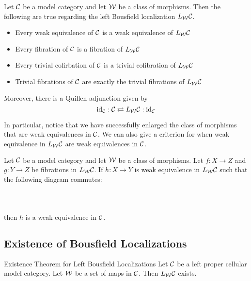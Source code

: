 \documentclass[a4paper]{article}
\begin{document}
\begin{thm}{}{} Let $\mathcal{C}$ be a model category and let $\mathcal{W}$ be a class of morphisms. Then the following are true regarding the left Bousfield localization $L_{\mathcal{W}}\mathcal{C}$. 
\begin{itemize}
\item Every weak equivalence of $\mathcal{C}$ is a weak equivalence of $L_{\mathcal{W}}\mathcal{C}$
\item Every fibration of $\mathcal{C}$ is a fibration of $L_{\mathcal{W}}\mathcal{C}$
\item Every trivial cofirbation of $\mathcal{C}$ is a trivial cofibration of $L_{\mathcal{W}}\mathcal{C}$
\item Trivial fibrations of $\mathcal{C}$ are exactly the trivial fibrations of $L_{\mathcal{W}}\mathcal{C}$
\end{itemize}
Moreover, there is a Quillen adjunction given by $$\text{id}_{\mathcal{C}}:\mathcal{C}\rightleftarrows L_{\mathcal{W}}\mathcal{C}:\text{id}_{\mathcal{C}}$$
\end{thm}

In particular, notice that we have successfully enlarged the class of morphisms that are weak equivalences in $\mathcal{C}$. We can also give a criterion for when weak equivalence in $L_{\mathcal{W}}\mathcal{C}$ are weak equivalences in $\mathcal{C}$. 

\begin{prp}{}{} Let $\mathcal{C}$ be a model category and let $\mathcal{W}$ be a class of morphisms. Let $f:X\to Z$ and $g:Y\to Z$ be fibrations in $L_{\mathcal{W}}\mathcal{C}$. If $h:X\to Y$ is weak equivalence in $L_{\mathcal{W}}\mathcal{C}$ such that the following diagram commutes: \\~\\
\\~\\
then $h$ is a weak equivalence in $\mathcal{C}$. 
\end{prp}

\subsection{Existence of Bousfield Localizations}
\begin{thm}{Existence Theorem for Left Bousfield Localizations}{} Let $\mathcal{C}$ be a left proper cellular model category. Let $\mathcal{W}$ be a set of maps in $\mathcal{C}$. Then $L_{\mathcal{W}}\mathcal{C}$ exists. 
\end{thm}
\end{document}
